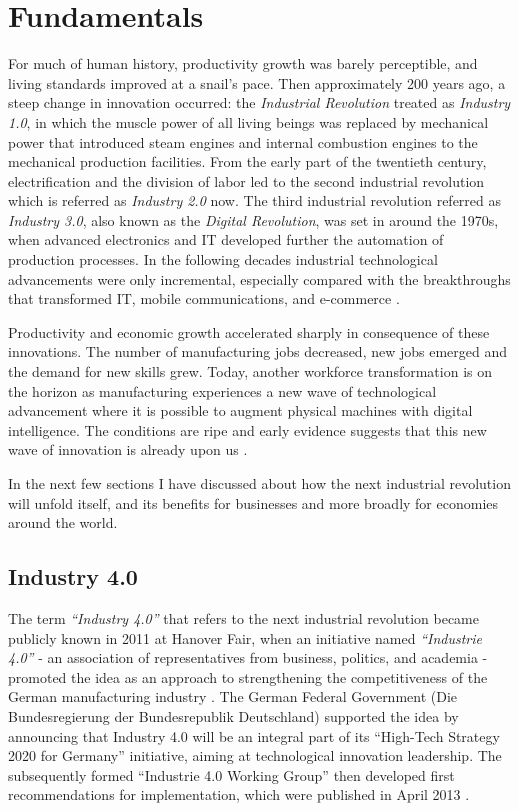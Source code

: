 \chapter{Fundamentals}
\label{chap:fundamentals}
For much of human history, productivity growth was barely perceptible, and living standards improved at a snail's pace. Then approximately 200 years ago, a steep change in innovation occurred: the \textit{Industrial Revolution} treated as \textit{Industry 1.0}, in which the muscle power of all living beings was replaced by mechanical power that introduced steam engines and internal combustion engines to the mechanical production facilities. From the early part of the twentieth century, electrification and the division of labor led to the second industrial revolution which is referred as \textit{Industry 2.0} now. The third industrial revolution referred as \textit{Industry 3.0}, also known as the \textit{Digital Revolution}, was set in around the 1970s, when advanced electronics and IT developed further the automation of production processes. In the following decades industrial technological advancements were only incremental, especially compared with the breakthroughs that transformed IT, mobile communications, and e-commerce \cite{INDUSINTERNET,IN4DESIGN,IN4BCG}.

Productivity and economic growth accelerated sharply in consequence of these innovations. The number of manufacturing jobs decreased, new jobs emerged and the demand for new skills grew. Today, another workforce transformation is on the horizon as manufacturing experiences a new wave of technological advancement where it is possible to augment physical machines with digital intelligence. The conditions are ripe and early evidence suggests that this new wave of innovation is already upon us \cite{INDUSINTERNET,MANMACHINE}.

In the next few sections I have discussed about how the next industrial revolution will unfold itself, and its benefits for businesses and more broadly for economies around the world.
\section{Industry 4.0}
The term \textit{“Industry 4.0”} that refers to the next industrial revolution became publicly known in 2011 at Hanover Fair, when an initiative named \textit{“Industrie 4.0”} - an association of representatives from business, politics, and academia - promoted the idea as an approach to strengthening the competitiveness of the German manufacturing industry \cite{VDINACH}. The German Federal Government (Die Bundesregierung der Bundesrepublik Deutschland) supported the idea by announcing that Industry 4.0 will be an integral part of its “High-Tech Strategy 2020 for Germany” initiative, aiming at technological innovation leadership. The subsequently formed “Industrie 4.0 Working Group” then developed first recommendations for implementation, which were published in April 2013 \cite{IN4DESIGN}.

